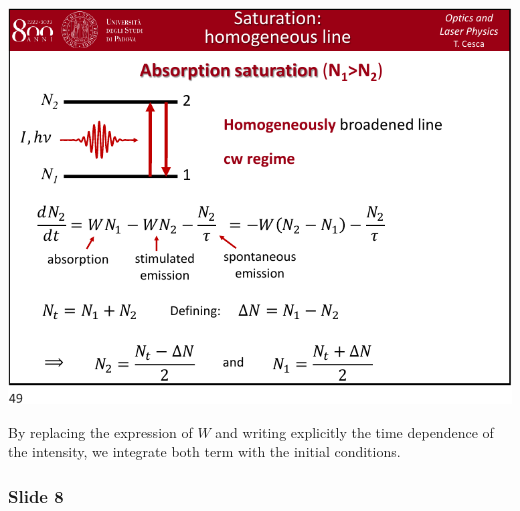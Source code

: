 \documentclass[../main/main.tex]{subfiles}
\begin{document}
\begin{minipage}[]{0.5\linewidth}
\centering
\includegraphics[page=7,width=1\textwidth]{../lessons/pdf_file/10_lecture.pdf}
\end{minipage}
\hspace{0.3cm}\vspace{0.3cm}
\begin{minipage}[c]{0.47\linewidth}

By replacing the expression of \( W \) and writing explicitly the time dependence of the intensity, we integrate both term with the initial conditions.

\end{minipage}

\subsubsection*{Slide 8}
\end{document}
